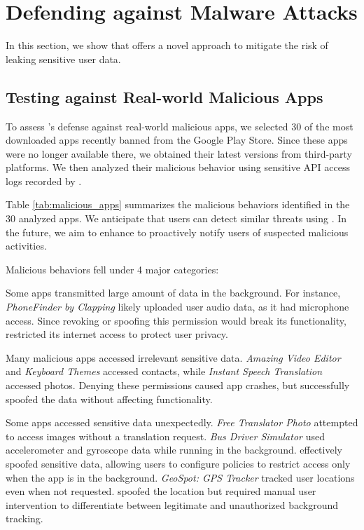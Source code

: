 \section{Defending against Malware Attacks}
\label{sec:mitigating_sca}

In this section, we show that \framework offers a novel approach to mitigate the
risk of leaking sensitive user data.

\subsection{Testing \framework{} against Real-world Malicious Apps}
\label{sec:malicious_apps}

To assess \framework{}'s defense against real-world malicious apps, we selected 30 of the most downloaded apps recently banned from the Google Play Store. Since these apps were no longer available there, we obtained their latest versions from third-party platforms. We then analyzed their malicious behavior using sensitive API access logs recorded by \framework{}.

Table \ref{tab:malicious_apps} summarizes the malicious behaviors identified in the 30 analyzed apps. We anticipate that users can detect similar threats using \framework{}. In the future, we aim to enhance \framework{} to proactively notify users of suspected malicious activities.

\noindent Malicious behaviors fell under 4 major categories:

 Some apps transmitted large amount of data in the background. For instance, \textit{PhoneFinder by Clapping} likely uploaded user audio data, as it had microphone access. Since revoking or spoofing this permission would break its functionality, \framework{} restricted its internet access to protect user privacy.

 Many malicious apps accessed irrelevant sensitive data. \textit{Amazing Video Editor} and \textit{Keyboard Themes} accessed contacts, while \textit{Instant Speech Translation} accessed photos. Denying these permissions caused app crashes, but \framework{} successfully spoofed the data without affecting functionality.

 Some apps accessed sensitive data unexpectedly. \textit{Free Translator Photo} attempted to access images without a translation request. \textit{Bus Driver Simulator} used accelerometer and gyroscope data while running in the background. \framework{} effectively spoofed sensitive data, allowing users to configure policies to restrict access only when the app is in the background. \textit{GeoSpot: GPS Tracker} tracked user locations even when not requested. \framework{} spoofed the location but required manual user intervention to differentiate between legitimate and unauthorized background tracking.

